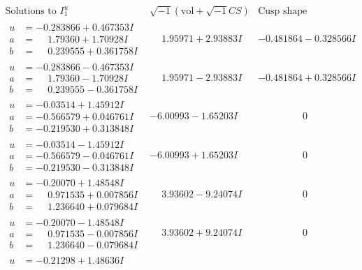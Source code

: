 \documentclass[1p]{elsarticle_modified}
\theoremstyle{definition}
\newcommand{\I}{\sqrt{-1}}
\begin{document}
$$\begin{array}{c|c|c}
\text{Solutions to }I^u_{1}& \I (\text{vol} + \sqrt{-1}CS) & \text{Cusp shape}\\
 \hline 
\begin{aligned}
u &= -0.283866 + 0.467353 I \\
a &= \phantom{-}1.79360 + 1.70928 I \\
b &= \phantom{-}0.239555 + 0.361758 I\end{aligned}
 & \phantom{-}1.95971 + 2.93883 I & -0.481864 - 0.328566 I \\ \hline\begin{aligned}
u &= -0.283866 - 0.467353 I \\
a &= \phantom{-}1.79360 - 1.70928 I \\
b &= \phantom{-}0.239555 - 0.361758 I\end{aligned}
 & \phantom{-}1.95971 - 2.93883 I & -0.481864 + 0.328566 I \\ \hline\begin{aligned}
u &= -0.03514 + 1.45912 I \\
a &= -0.566579 + 0.046761 I \\
b &= -0.219530 + 0.313848 I\end{aligned}
 & -6.00993 - 1.65203 I & \phantom{-0.000000 } 0 \\ \hline\begin{aligned}
u &= -0.03514 - 1.45912 I \\
a &= -0.566579 - 0.046761 I \\
b &= -0.219530 - 0.313848 I\end{aligned}
 & -6.00993 + 1.65203 I & \phantom{-0.000000 } 0 \\ \hline\begin{aligned}
u &= -0.20070 + 1.48548 I \\
a &= \phantom{-}0.971535 + 0.007856 I \\
b &= \phantom{-}1.236640 + 0.079684 I\end{aligned}
 & \phantom{-}3.93602 - 9.24074 I & \phantom{-0.000000 } 0 \\ \hline\begin{aligned}
u &= -0.20070 - 1.48548 I \\
a &= \phantom{-}0.971535 - 0.007856 I \\
b &= \phantom{-}1.236640 - 0.079684 I\end{aligned}
 & \phantom{-}3.93602 + 9.24074 I & \phantom{-0.000000 } 0 \\ \hline\begin{aligned}
u &= -0.21298 + 1.48636 I \\

\end{aligned}
\end{array}$$
\end{document}
